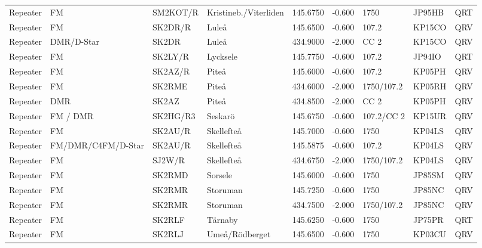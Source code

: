 {\begin{landscape}
\begin{longtable}{llllrrlll}
Repeater   & FM          & SM2KOT/R  & Kristineb./Viterliden          & 145.6750     & -0.600     & 1750       & JP95HB      & QRT      \\
Repeater   & FM          & SK2DR/R   & Luleå              & 145.6500     & -0.600     & 107.2      & KP15CO      & QRV      \\
Repeater   & DMR/D-Star  & SK2DR     & Luleå              & 434.9000     & -2.000     & CC 2       & KP15CO      & QRV      \\
Repeater   & FM          & SK2LY/R   & Lycksele           & 145.7750     & -0.600     & 107.2      & JP94IO      & QRT      \\
Repeater   & FM          & SK2AZ/R   & Piteå              & 145.6000     & -0.600     & 107.2      & KP05PH      & QRV      \\
Repeater   & FM          & SK2RME    & Piteå              & 434.6000     & -2.000     & 1750/107.2 & KP05RH      & QRV      \\
Repeater   & DMR         & SK2AZ     & Piteå              & 434.8500     & -2.000     & CC 2       & KP05PH      & QRV      \\
Repeater   & FM / DMR    & SK2HG/R3  & Seskarö            & 145.6750     & -0.600     & 107.2/CC 2 & KP15UR      & QRV      \\
Repeater   & FM          & SK2AU/R   & Skellefteå         & 145.7000     & -0.600     & 1750       & KP04LS      & QRV      \\
Repeater   & FM/DMR/C4FM/D-Star      & SK2AU/R   & Skellefteå         & 145.5875     & -0.600     & 107.2      & KP04LS      & QRV      \\
Repeater   & FM          & SJ2W/R    & Skellefteå         & 434.6750     & -2.000     & 1750/107.2 & KP04LS      & QRV      \\
Repeater   & FM          & SK2RMD    & Sorsele            & 145.6000     & -0.600     & 1750       & JP85SM      & QRV      \\
Repeater   & FM          & SK2RMR    & Storuman           & 145.7250     & -0.600     & 1750       & JP85NC      & QRV      \\
Repeater   & FM          & SK2RMR    & Storuman           & 434.7500     & -2.000     & 1750/107.2 & JP85NC      & QRV      \\
Repeater   & FM          & SK2RLF    & Tärnaby            & 145.6250     & -0.600     & 1750       & JP75PR      & QRT      \\
Repeater   & FM          & SK2RLJ    & Umeå/Rödberget     & 145.6500     & -0.600     & 1750       & KP03CU      & QRV      \\

\end{longtable}
\end{landscape}}
